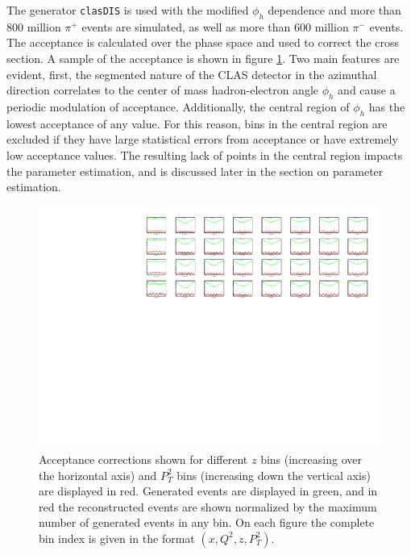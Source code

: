 The generator \texttt{clasDIS} is used with the modified $\phi_h$ dependence and more than 800 million $\pi^+$ events are simulated, as well as more than 600 million $\pi^-$ events.  The acceptance is calculated over the phase space and used to correct the cross section.  A sample of the acceptance is shown in figure \ref{fig:acceptance}.  Two main features are evident, first, the segmented nature of the CLAS detector in the azimuthal direction correlates to the center of mass hadron-electron angle $\phi_h$ and cause a periodic modulation of acceptance.  Additionally, the central region of $\phi_h$ has the lowest acceptance of any value.  For this reason, bins in the central region are excluded if they have large statistical errors from acceptance or have extremely low acceptance values.  The resulting lack of points in the central region impacts the parameter estimation, and is discussed later in the section on parameter estimation.  

\begin{figure}
  \centering
  \includegraphics[width=\textwidth]{image/plots/sidis/acceptance.pdf}
  \caption[Acceptance corrections for SIDIS]{Acceptance corrections shown for different $z$ bins (increasing over the horizontal axis) and $P_{T}^{2}$ bins (increasing down the vertical axis) are displayed in red.  Generated events are displayed in green, and in red the reconstructed events are shown normalized by the maximum number of generated events in any bin.  On each figure the complete bin index is given in the format $(x, Q^2, z, P_{T}^{2})$.}
  \label{fig:acceptance}

\end{figure}


